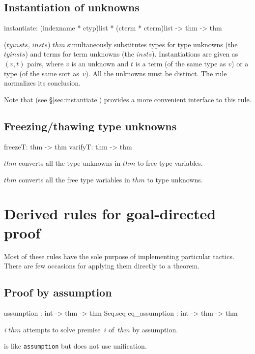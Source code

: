 \subsection{Instantiation of unknowns}
\begin{ttbox} 
instantiate: (indexname * ctyp){\thinspace}list * (cterm * cterm){\thinspace}list -> thm -> thm
\end{ttbox}
\begin{ttdescription}
\item[\ttindexbold{instantiate} ($tyinsts$, $insts$) $thm$] 
simultaneously substitutes types for type unknowns (the
$tyinsts$) and terms for term unknowns (the $insts$).  Instantiations are
given as $(v,t)$ pairs, where $v$ is an unknown and $t$ is a term (of the
same type as $v$) or a type (of the same sort as~$v$).  All the unknowns
must be distinct.  The rule normalizes its conclusion.

Note that  (see \S\ref{sec:instantiate})
provides a more convenient interface to this rule.
\end{ttdescription}


\subsection{Freezing/thawing type unknowns}
\begin{ttbox} 
freezeT: thm -> thm
varifyT: thm -> thm
\end{ttbox}
\begin{ttdescription}
\item[\ttindexbold{freezeT} $thm$] 
converts all the type unknowns in $thm$ to free type variables.

\item[\ttindexbold{varifyT} $thm$] 
converts all the free type variables in $thm$ to type unknowns.
\end{ttdescription}


\section{Derived rules for goal-directed proof}
Most of these rules have the sole purpose of implementing particular
tactics.  There are few occasions for applying them directly to a theorem.

\subsection{Proof by assumption}
\begin{ttbox} 
assumption    : int -> thm -> thm Seq.seq
eq_assumption : int -> thm -> thm
\end{ttbox}
\begin{ttdescription}
\item[\ttindexbold{assumption} {\it i} $thm$] 
attempts to solve premise~$i$ of~$thm$ by assumption.

\item[\ttindexbold{eq_assumption}] 
is like {\tt assumption} but does not use unification.
\end{ttdescription}


